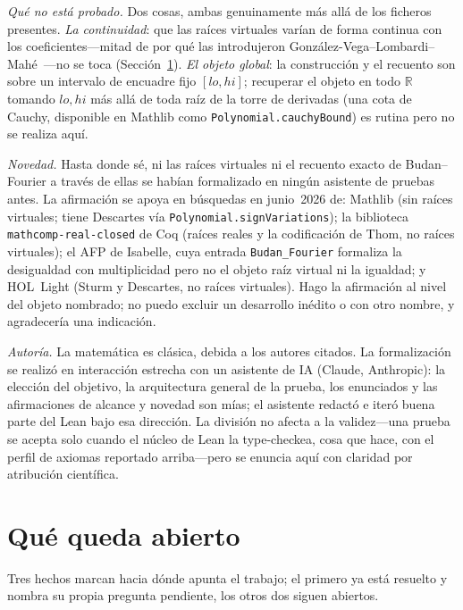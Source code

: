 \documentclass[11pt]{article}
\newcommand{\lean}[1]{\texttt{#1}}
\newcommand{\R}{\mathbb{R}}
\begin{document}
\emph{Qu\'e no est\'a probado.} Dos cosas, ambas genuinamente m\'as all\'a de los ficheros presentes.
\emph{La continuidad}: que las ra\'ices virtuales var\'ian de forma continua con los
coeficientes---mitad de por qu\'e las introdujeron Gonz\'alez-Vega--Lombardi--Mah\'e~\cite{glm}---no se
toca (Secci\'on~\ref{sec:questions}). \emph{El objeto global}: la construcci\'on y el recuento son sobre
un intervalo de encuadre fijo $[lo,hi]$; recuperar el objeto en todo $\R$ tomando $lo,hi$ m\'as all\'a
de toda ra\'iz de la torre de derivadas (una cota de Cauchy, disponible en Mathlib como
\lean{Polynomial.cauchyBound}) es rutina pero no se realiza aqu\'i.

\emph{Novedad.} Hasta donde s\'e, ni las ra\'ices virtuales ni el recuento exacto de Budan--Fourier a
trav\'es de ellas se hab\'ian formalizado en ning\'un asistente de pruebas antes. La afirmaci\'on se
apoya en b\'usquedas en junio~2026 de: Mathlib (sin ra\'ices virtuales; tiene Descartes v\'ia
\lean{Polynomial.signVariations}); la biblioteca \lean{mathcomp-real-closed} de Coq (ra\'ices reales y
la codificaci\'on de Thom, no ra\'ices virtuales); el AFP de Isabelle, cuya entrada \lean{Budan\_Fourier}
formaliza la desigualdad con multiplicidad pero no el objeto ra\'iz virtual ni la igualdad; y HOL~Light
(Sturm y Descartes, no ra\'ices virtuales). Hago la afirmaci\'on al nivel del objeto nombrado; no puedo
excluir un desarrollo in\'edito o con otro nombre, y agradecer\'ia una indicaci\'on.

\emph{Autor\'ia.} La matem\'atica es cl\'asica, debida a los autores citados. La formalizaci\'on se
realiz\'o en interacci\'on estrecha con un asistente de IA (Claude, Anthropic): la elecci\'on del
objetivo, la arquitectura general de la prueba, los enunciados y las afirmaciones de alcance y novedad
son m\'ias; el asistente redact\'o e iter\'o buena parte del Lean bajo esa direcci\'on. La divisi\'on
no afecta a la validez---una prueba se acepta solo cuando el n\'ucleo de Lean la type-checkea, cosa que
hace, con el perfil de axiomas reportado arriba---pero se enuncia aqu\'i con claridad por atribuci\'on
cient\'ifica.

\section{Qu\'e queda abierto}\label{sec:questions}

Tres hechos marcan hacia d\'onde apunta el trabajo; el primero ya est\'a resuelto y nombra su propia
pregunta pendiente, los otros dos siguen abiertos.
\end{document}
